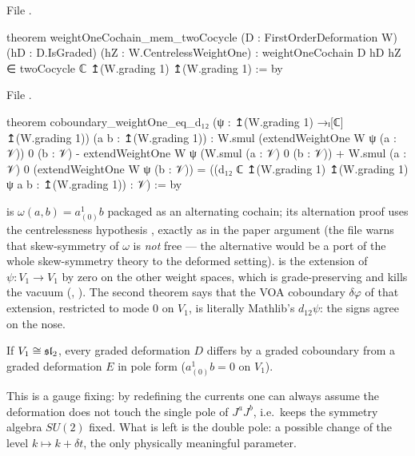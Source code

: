 \noindent File .
\begin{leancode}
theorem weightOneCochain_mem_twoCocycle (D : FirstOrderDeformation W) (hD : D.IsGraded)
    (hZ : W.CentrelessWeightOne) :
    weightOneCochain D hD hZ ∈ twoCocycle ℂ ↥(W.grading 1) ↥(W.grading 1) := by
\end{leancode}
\noindent File .
\begin{leancode}
theorem coboundary_weightOne_eq_d₁₂ (ψ : ↥(W.grading 1) →ₗ[ℂ] ↥(W.grading 1))
    (a b : ↥(W.grading 1)) :
    W.smul (extendWeightOne W ψ (a : 𝒱)) 0 (b : 𝒱)
        - extendWeightOne W ψ (W.smul (a : 𝒱) 0 (b : 𝒱))
        + W.smul (a : 𝒱) 0 (extendWeightOne W ψ (b : 𝒱))
      = ((d₁₂ ℂ ↥(W.grading 1) ↥(W.grading 1) ψ a b : ↥(W.grading 1)) : 𝒱) := by
\end{leancode}

\begin{dictionary}
 is $\omega(a,b) = a^1_{(0)}b$ packaged as an alternating cochain;
its alternation proof uses the centrelessness hypothesis , exactly as in the paper argument
(the file warns that skew-symmetry of $\omega$ is \emph{not} free --- the alternative would be a port
of the whole skew-symmetry theory to the deformed setting).  is the
extension of $\psi:V_1\to V_1$ by zero on the other weight spaces, which is grade-preserving and
kills the vacuum (, ). The second
theorem says that the VOA coboundary $\delta\varphi$ of that extension, restricted to mode $0$ on
$V_1$, is literally Mathlib's $d_{12}\psi$: the signs agree on the nose.
\end{dictionary}

\begin{corollary}[normalisation]\label{l09:cor:normalise}
If $V_1\cong\mathfrak{sl}_2$, every graded deformation $D$ differs by a graded coboundary from a graded
deformation $E$ in pole form ($a^1_{(0)}b = 0$ on $V_1$).
\end{corollary}
\begin{physics}
This is a gauge fixing: by redefining the currents one can always assume the deformation does not touch
the single pole of $J^aJ^b$, i.e.\ keeps the symmetry algebra $SU(2)$ fixed. What is left is the double
pole: a possible change of the level $k\mapsto k+\delta t$, the only physically meaningful parameter.
\end{physics}



